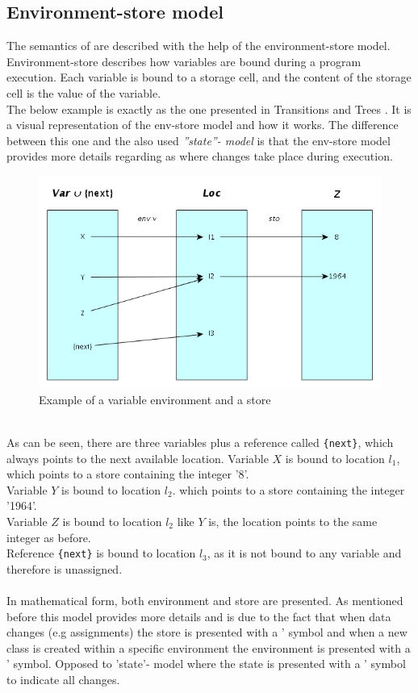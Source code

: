 \subsection{Environment-store model}
The semantics of \langname{} are described with the help of the environment-store model. Environment-store describes how variables are bound during a program execution. Each variable is bound to a storage cell, and the content of the storage cell is the value of the variable.\\
The below example is exactly as the one presented in Transitions and Trees \cite{transtrees}. It is a visual representation of the env-store model and how it works. The difference between this one and the also used \emph{''state''- model} is that the env-store model provides more details regarding as where changes take place during execution.
\begin{figure}[!h]
\centering
	\includegraphics[scale=0.55]{img/envstore.png}
	\caption{Example of a variable environment and a store \cite{transtrees}}
\end{figure}\\
As can be seen, there are three variables plus a reference called \texttt{\{next\}}, which always points to the next available location.
Variable $X$ is bound to location $l_1$, which points to a store containing the integer '8'.\\
Variable $Y$ is bound to location $l_2$. which points to a store containing the integer '1964'.\\
Variable $Z$ is bound to location $l_2$ like $Y$ is, the location points to the same integer as before.\\
Reference \texttt{\{next\}} is bound to location $l_3$, as it is not bound to any variable and therefore is unassigned.\\\\
In mathematical form, both environment and store are presented. As mentioned before this model provides more details and is due to the fact that when data changes (e.g assignments) the store is presented with a ' symbol and when a new class is created within a specific environment the environment is presented with a ' symbol. Opposed to 'state'- model where the state is presented with a ' symbol to indicate all changes.